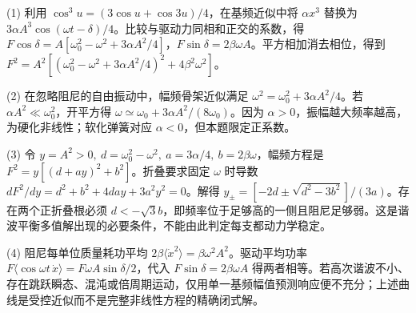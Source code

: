 (1) 利用 \(\cos^3u=(3\cos u+\cos3u)/4\)，在基频近似中将 \(\alpha x^3\) 替换为 \(3\alpha A^3\cos(\omega t-\delta)/4\)。比较与驱动力同相和正交的系数，得 \(F\cos\delta=A[\omega_0^2-\omega^2+3\alpha A^2/4]\)，\(F\sin\delta=2\beta\omega A\)。平方相加消去相位，得到 \(F^2=A^2[(\omega_0^2-\omega^2+3\alpha A^2/4)^2+4\beta^2\omega^2]\)。

(2) 在忽略阻尼的自由振动中，幅频骨架近似满足 \(\omega^2=\omega_0^2+3\alpha A^2/4\)。若 \(\alpha A^2\ll\omega_0^2\)，开平方得 \(\omega\simeq\omega_0+3\alpha A^2/(8\omega_0)\)。因为 \(\alpha>0\)，振幅越大频率越高，为硬化非线性；软化弹簧对应 \(\alpha<0\)，但本题限定正系数。

(3) 令 \(y=A^2>0,\ d=\omega_0^2-\omega^2,\ a=3\alpha/4,\ b=2\beta\omega\)，幅频方程是 \(F^2=y[(d+ay)^2+b^2]\)。折叠要求固定 \(\omega\) 时导数 \(dF^2/dy=d^2+b^2+4day+3a^2y^2=0\)。解得 \(y_\pm=[-2d\pm\sqrt{d^2-3b^2}]/(3a)\)。存在两个正折叠根必须 \(d<-\sqrt3 b\)，即频率位于足够高的一侧且阻尼足够弱。这是谐波平衡多值解出现的必要条件，不能由此判定每支都动力学稳定。

(4) 阻尼每单位质量耗功平均 \(2\beta\langle\dot x^2\rangle=\beta\omega^2A^2\)。驱动平均功率 \(F\langle\cos\omega t\,\dot x\rangle=F\omega A\sin\delta/2\)，代入 \(F\sin\delta=2\beta\omega A\) 得两者相等。若高次谐波不小、存在跳跃瞬态、混沌或倍周期运动，仅用单一基频幅值预测响应便不充分；上述曲线是受控近似而不是完整非线性方程的精确闭式解。
